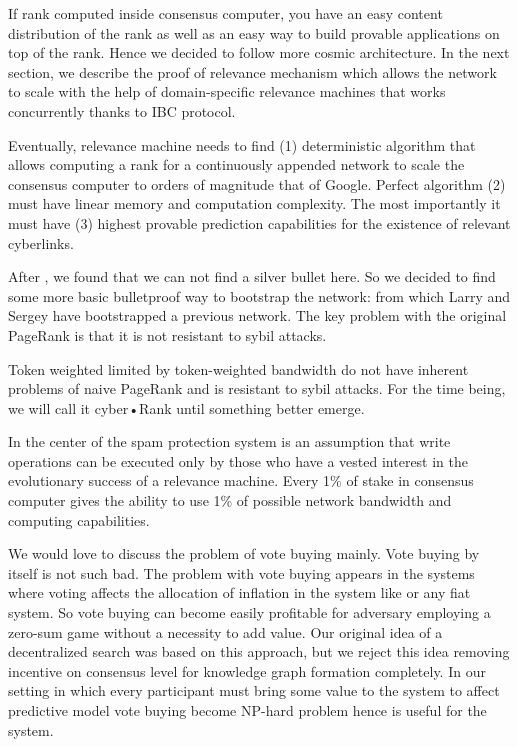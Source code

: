 \documentclass[8pt,oneside]{amsart}
\newcommand{\linkred}[2]{\href{#1}{\color{red}{#2}}}
\newcommand{\linkgreen}[2]{\href{#1}{\color{green}{#2}}}
\begin{document}
If rank computed inside consensus computer, you have an easy content distribution of the rank as well as an easy way to build provable applications on top of the rank. Hence we decided to follow more cosmic architecture. In the next section, we describe the proof of relevance mechanism which allows the network to scale with the help of domain-specific relevance machines that works concurrently thanks to IBC protocol.

Eventually, relevance machine needs to find (1) deterministic algorithm that allows computing a rank for a continuously appended network to scale the consensus computer to orders of magnitude that of Google. Perfect algorithm (2) must have linear memory and computation complexity. The most importantly it must have (3) highest provable prediction capabilities for the existence of relevant cyberlinks.

After \linkred{https://arxiv.org/pdf/1709.09002.pdf}{some research}, we found that we can not find a silver bullet here. So we decided to find some more basic bulletproof way to bootstrap the network: \linkred{http://ilpubs.stanford.edu:8090/422/1/1999-66.pdf}{the rank} from which Larry and Sergey have bootstrapped a previous network. The key problem with the original PageRank is that it is not resistant to sybil attacks.

Token weighted \linkred{http://ilpubs.stanford.edu:8090/422/1/1999-66.pdf}{PageRank} limited by token-weighted bandwidth do not have inherent problems of naive PageRank and is resistant to sybil attacks. For the time being, we will call it cyber•Rank until something better emerge.

In the center of the spam protection system is an assumption that write operations can be executed only by those who have a vested interest in the evolutionary success of a relevance machine. Every 1\% of stake in consensus computer gives the ability to use 1\% of possible network bandwidth and computing capabilities.

We would love to discuss the problem of vote buying mainly. Vote buying by itself is not such bad. The problem with vote buying appears in the systems where voting affects the allocation of inflation in the system like \linkgreen{http://ipfs.io/ipfs/QmepU77tqMAHHuiSASUvUnu8f8ENuPF2Kfs97WjLn8vAS3}{Steem}
or any fiat system. So vote buying can become easily profitable for adversary employing a zero-sum game without a necessity to add value. Our original idea of a decentralized search was based on this approach, but we reject this idea removing incentive on consensus level for knowledge graph formation completely. In our setting in which every participant must bring some value to the system to affect predictive model vote buying become NP-hard problem hence is useful for the system.
\end{document}
